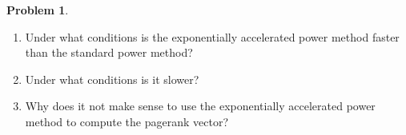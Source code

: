 \documentclass[10pt]{article}
\theoremstyle{definition}
\newtheorem{problem}{Problem}
\newcommand{\p}{\mathbf P}
\newcommand{\pb}{\bar {\p}}
\newcommand{\pbb}{\bar {\pb}}
\newcommand{\x}{\mathbf x}
\newcommand{\y}{\mathbf y}
\newcommand{\ltwo}[1]{{\lVert {#1} \rVert}_2}
\begin{document}
{\begin{problem}
\begin{enumerate}

            What is the runtime of computing $\y^{(K)}$ in terms of $\epsilon$?
            \vspace{4.5in}

        \newpage
        \item
            Under what conditions is the exponentially accelerated power method faster than the standard power method?
            \vspace{4in}

        \item
            Under what conditions is it slower?
            \vspace{3in}

        \newpage
        \item
            Why does it not make sense to use the exponentially accelerated power method to compute the pagerank vector?
            \vspace{4in}
%
    \end{enumerate}
\end{problem}
}
\end{document}
